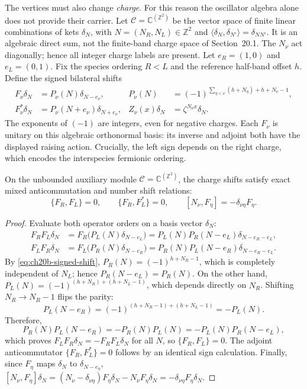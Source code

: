 The vertices must also change \emph{charge}.  For this reason the
oscillator algebra alone does not provide their carrier.  Let
\(\mathcal C=\mathbb C^{(\mathbb Z^2)}\) be the vector space of finite
linear combinations of kets \(\delta_N\), with
\(N=(N_R,N_L)\in\mathbb Z^2\) and
\(\langle\delta_N,\delta_{N'}\rangle=\delta_{NN'}\).
It is an algebraic direct sum, not the finite-band charge space of
Section~20.1.  The \(N_\nu\) act diagonally; hence all integer charge
labels are present.  Let \(e_R=(1,0)\) and \(e_L=(0,1)\).  Fix the
species ordering \(R<L\) and the reference half-band offset \(h\).
Define the signed bilateral shifts
\begin{align}
 F_\nu\delta_N&=P_\nu(N)\delta_{N-e_\nu},
 &P_\nu(N)&=(-1)^{\sum_{\eta<\nu}(h+N_\eta)+h+N_\nu-1},
 \label{eq:ch20b-signed-shift}\\
 F_\nu^*\delta_N&=P_\nu(N+e_\nu)\delta_{N+e_\nu},
 &Z_\nu(x)\delta_N&=\zeta^{N_\nu x}\delta_N.
 \label{eq:ch20b-phase-action}
\end{align}
The exponents of \((-1)\) are integers, even for negative charges.
Each \(F_\nu\) is unitary on this algebraic orthonormal basis:
its inverse and adjoint both have the displayed raising action.
Crucially, the left sign depends on the right charge, which encodes
the interspecies fermionic ordering.

\begin{theorem}
\label{thm:ch20b-shift-anticommute}
On the unbounded auxiliary module $\mathcal C = \mathbb C^{(\mathbb Z^2)}$, the charge shifts
satisfy exact mixed anticommutation and number shift relations:
\begin{equation}
 \{F_R, F_L\} = 0, \qquad
 \{F_R, F_L^*\} = 0, \qquad
 [N_\nu, F_\eta] = -\delta_{\nu\eta} F_\eta.
 \label{eq:ch20b-shift-car}
\end{equation}
\end{theorem}
\begin{proof}
Evaluate both operator orders on a basis vector $\delta_N$:
\begin{align*}
 F_R F_L \delta_N
  &= F_R \bigl(P_L(N) \delta_{N-e_L}\bigr)
   = P_L(N) P_R(N-e_L) \delta_{N-e_R-e_L}, \\
 F_L F_R \delta_N
  &= F_L \bigl(P_R(N) \delta_{N-e_R}\bigr)
   = P_R(N) P_L(N-e_R) \delta_{N-e_R-e_L}.
\end{align*}
By \eqref{eq:ch20b-signed-shift}, $P_R(N) = (-1)^{h+N_R-1}$, which is completely independent of $N_L$;
hence $P_R(N-e_L) = P_R(N)$.
On the other hand, $P_L(N) = (-1)^{(h+N_R) + (h+N_L-1)}$, which depends directly on $N_R$.
Shifting $N_R \to N_R - 1$ flips the parity:
\[
 P_L(N-e_R) = (-1)^{(h+N_R-1) + (h+N_L-1)} = - P_L(N).
\]
Therefore,
\[
 P_R(N) P_L(N-e_R) = - P_R(N) P_L(N) = - P_L(N) P_R(N-e_L),
\]
which proves $F_L F_R \delta_N = - F_R F_L \delta_N$ for all $N$, so $\{F_R, F_L\} = 0$.
The adjoint anticommutator $\{F_R, F_L^*\} = 0$ follows by an identical sign calculation.
Finally, since $F_\eta$ maps $\delta_N$ to $\delta_{N-e_\eta}$,
$[N_\nu, F_\eta]\delta_N = (N_\nu - \delta_{\nu\eta})F_\eta\delta_N - N_\nu F_\eta\delta_N = -\delta_{\nu\eta}F_\eta\delta_N$.
\end{proof}

